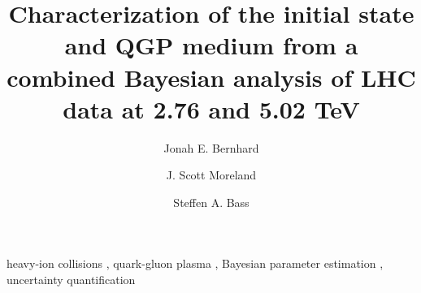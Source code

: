\documentclass[3p,times,procedia]{elsarticle}
\begin{document}
\begin{frontmatter}


\title{Characterization of the initial state and QGP medium from a combined Bayesian analysis of LHC data at 2.76 and 5.02 TeV}

\author{Jonah E. Bernhard}
\author{J. Scott Moreland}
\author{Steffen A. Bass}

\address{Department of Physics, Duke University, Durham, NC 27708}

\begin{abstract}
\end{abstract}

\begin{keyword}
  heavy-ion collisions \sep
  quark-gluon plasma \sep
  Bayesian parameter estimation \sep
  uncertainty quantification
\end{keyword}

\end{frontmatter}

\section{}



\end{document}
